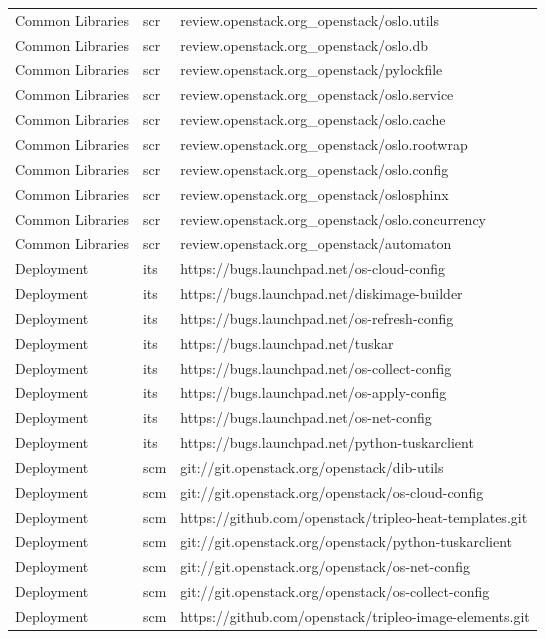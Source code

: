 \begin{center}
\begin{longtable}{|p{4cm}|p{1cm}|p{10cm}|}
Common Libraries&scr&review.openstack.org\_openstack/oslo.utils\\ 
Common Libraries&scr&review.openstack.org\_openstack/oslo.db\\ 
Common Libraries&scr&review.openstack.org\_openstack/pylockfile\\ 
Common Libraries&scr&review.openstack.org\_openstack/oslo.service\\ 
Common Libraries&scr&review.openstack.org\_openstack/oslo.cache\\ 
Common Libraries&scr&review.openstack.org\_openstack/oslo.rootwrap\\ 
Common Libraries&scr&review.openstack.org\_openstack/oslo.config\\ 
Common Libraries&scr&review.openstack.org\_openstack/oslosphinx\\ 
Common Libraries&scr&review.openstack.org\_openstack/oslo.concurrency\\ 
Common Libraries&scr&review.openstack.org\_openstack/automaton\\ 
Deployment&its&https://bugs.launchpad.net/os-cloud-config\\ 
Deployment&its&https://bugs.launchpad.net/diskimage-builder\\ 
Deployment&its&https://bugs.launchpad.net/os-refresh-config\\ 
Deployment&its&https://bugs.launchpad.net/tuskar\\ 
Deployment&its&https://bugs.launchpad.net/os-collect-config\\ 
Deployment&its&https://bugs.launchpad.net/os-apply-config\\ 
Deployment&its&https://bugs.launchpad.net/os-net-config\\ 
Deployment&its&https://bugs.launchpad.net/python-tuskarclient\\ 
Deployment&scm&git://git.openstack.org/openstack/dib-utils\\ 
Deployment&scm&git://git.openstack.org/openstack/os-cloud-config\\ 
Deployment&scm&https://github.com/openstack/tripleo-heat-templates.git\\ 
Deployment&scm&git://git.openstack.org/openstack/python-tuskarclient\\ 
Deployment&scm&git://git.openstack.org/openstack/os-net-config\\ 
Deployment&scm&git://git.openstack.org/openstack/os-collect-config\\ 
Deployment&scm&https://github.com/openstack/tripleo-image-elements.git\\ 

\end{longtable}
\end{center}
